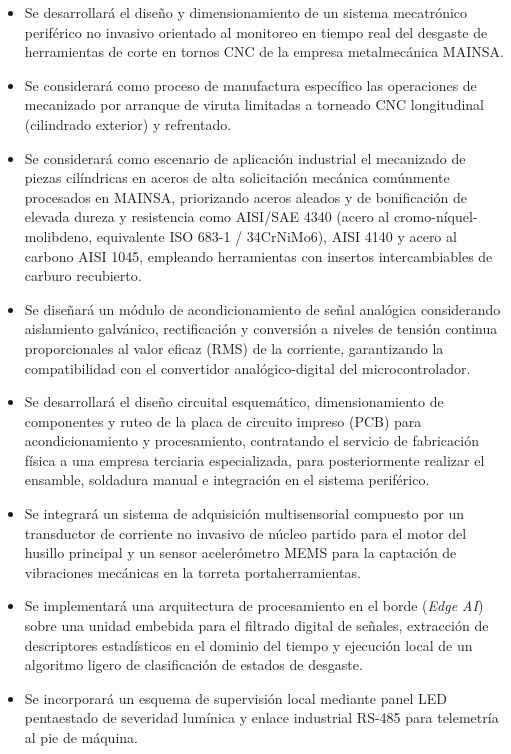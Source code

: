 \begin{itemize}
\item Se desarrollará el diseño y dimensionamiento de un sistema mecatrónico periférico no invasivo orientado al monitoreo en tiempo real del desgaste de herramientas de corte en tornos CNC de la empresa metalmecánica MAINSA.
\item Se considerará como proceso de manufactura específico las operaciones de mecanizado por arranque de viruta limitadas a torneado CNC longitudinal (cilindrado exterior) y refrentado.
\item Se considerará como escenario de aplicación industrial el mecanizado de piezas cilíndricas en aceros de alta solicitación mecánica comúnmente procesados en MAINSA, priorizando aceros aleados y de bonificación de elevada dureza y resistencia como AISI/SAE 4340 (acero al cromo-níquel-molibdeno, equivalente ISO 683-1 / 34CrNiMo6), AISI 4140 y acero al carbono AISI 1045, empleando herramientas con insertos intercambiables de carburo recubierto.
\item Se diseñará un módulo de acondicionamiento de señal analógica considerando aislamiento galvánico, rectificación y conversión a niveles de tensión continua proporcionales al valor eficaz (RMS) de la corriente, garantizando la compatibilidad con el convertidor analógico-digital del microcontrolador.
\item Se desarrollará el diseño circuital esquemático, dimensionamiento de componentes y ruteo de la placa de circuito impreso (PCB) para acondicionamiento y procesamiento, contratando el servicio de fabricación física a una empresa terciaria especializada, para posteriormente realizar el ensamble, soldadura manual e integración en el sistema periférico.
\item Se integrará un sistema de adquisición multisensorial compuesto por un transductor de corriente no invasivo de núcleo partido para el motor del husillo principal y un sensor acelerómetro MEMS para la captación de vibraciones mecánicas en la torreta portaherramientas.
\item Se implementará una arquitectura de procesamiento en el borde (\textit{Edge AI}) sobre una unidad embebida para el filtrado digital de señales, extracción de descriptores estadísticos en el dominio del tiempo y ejecución local de un algoritmo ligero de clasificación de estados de desgaste.
\item Se incorporará un esquema de supervisión local mediante panel LED pentaestado de severidad lumínica y enlace industrial RS-485 para telemetría al pie de máquina.

\end{itemize}
